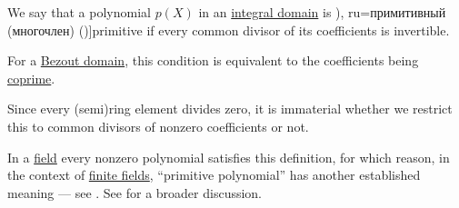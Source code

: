 \begin{definition}\label{def:domain_primitive_polynomial}
  We say that a polynomial \( p(X) \) in an \hyperref[def:integral_domain]{integral domain} is \term[bg=примитивен (полином) (\cite[43]{ГеновМиховскиМоллов1991Алгебра}), ru=примитивный (многочлен) (\cite[124]{Винберг2014Алгебра})]{primitive} if every common divisor of its coefficients is invertible.
\end{definition}
\begin{comments}
  \item For a \hyperref[def:bezout_domain]{Bezout domain}, this condition is equivalent to the coefficients being \hyperref[def:coprime_elements]{coprime}.

  \item Since every (semi)ring element divides zero, it is immaterial whether we restrict this to common divisors of nonzero coefficients or not.

  \item In a \hyperref[def:field]{field} every nonzero polynomial satisfies this definition, for which reason, in the context of \hyperref[def:finite_field]{finite fields}, \enquote{primitive polynomial} has another established meaning --- see . See  for a broader discussion.
\end{comments}

